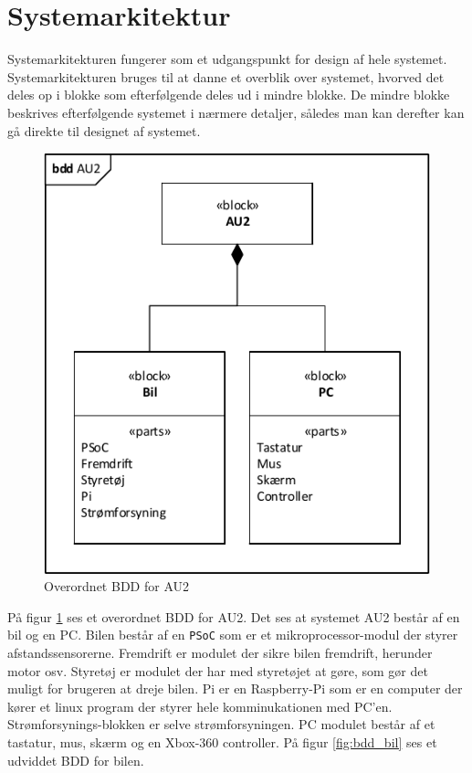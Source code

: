 \section{Systemarkitektur}
\label{ch:Systemarkitektur}
Systemarkitekturen fungerer som et udgangspunkt for design af hele systemet.
Systemarkitekturen bruges til at danne et overblik over systemet, hvorved det deles op i blokke som efterfølgende deles ud i mindre blokke. De mindre blokke beskrives efterfølgende systemet i nærmere detaljer, således man kan derefter kan gå direkte til designet af systemet. 

\begin{figure}[h]
\centering
\includegraphics[scale=1]{../fig/diagrammer/bdd_au2.pdf}
\caption{Overordnet BDD for AU2}
\label{fig:bdd_au2}
\end{figure}
På figur \ref{fig:bdd_au2} ses et overordnet BDD for AU2. Det ses at systemet AU2 består af en bil og en PC. Bilen består af en \texttt{PSoC} som er et mikroprocessor-modul der styrer afstandssensorerne. Fremdrift er modulet der sikre bilen fremdrift, herunder motor osv. Styretøj er modulet der har med styretøjet at gøre, som gør det muligt for brugeren at dreje bilen. Pi er en Raspberry-Pi som er en computer der kører et linux program der styrer hele komminukationen med PC'en. Strømforsynings-blokken er selve strømforsyningen. PC modulet består af et tastatur, mus, skærm og en Xbox-360 controller. På figur \ref{fig:bdd_bil} ses et udviddet BDD for bilen.  


